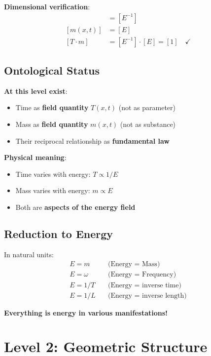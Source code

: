 	\textbf{Dimensional verification}:
	\begin{align}
		[T(x,t)] &= [E^{-1}] \\
		[m(x,t)] &= [E] \\
		[T \cdot m] &= [E^{-1}] \cdot [E] = [1] \quad \checkmark
	\end{align}
	
	\subsection{Ontological Status}
	
	\textbf{At this level exist}:
	\begin{itemize}
		\item Time as \textbf{field quantity} $T(x,t)$ (not as parameter)
		\item Mass as \textbf{field quantity} $m(x,t)$ (not as substance)
		\item Their reciprocal relationship as \textbf{fundamental law}
	\end{itemize}
	
	\textbf{Physical meaning}:
	\begin{itemize}
		\item Time varies with energy: $T \propto 1/E$
		\item Mass varies with energy: $m \propto E$
		\item Both are \textbf{aspects of the energy field}
	\end{itemize}
	
	\subsection{Reduction to Energy}
	
	In natural units:
	\begin{align}
		E = m \quad &\text{(Energy = Mass)} \\
		E = \omega \quad &\text{(Energy = Frequency)} \\
		E = 1/T \quad &\text{(Energy = inverse time)} \\
		E = 1/L \quad &\text{(Energy = inverse length)}
	\end{align}
	
	\textbf{Everything is energy in various manifestations!}
	
	\section{Level 2: Geometric Structure}
	
